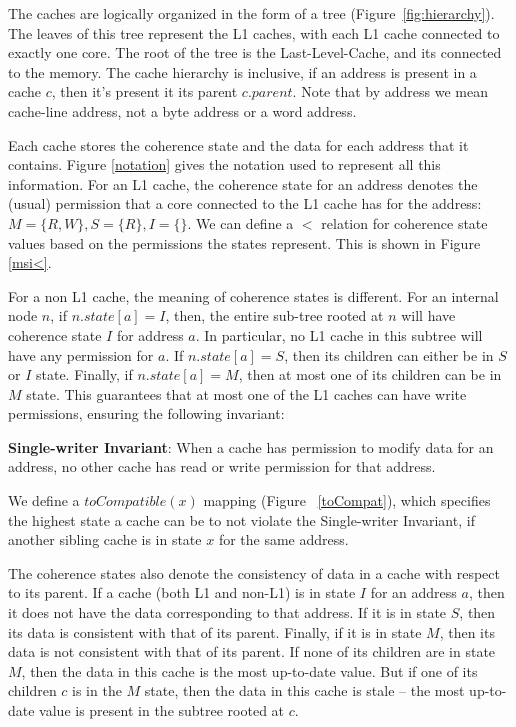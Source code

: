The caches are logically organized in the form of a tree
(Figure~\ref{fig:hierarchy}). The leaves of this tree represent the L1 caches,
with each L1 cache connected to exactly one core. The root of the tree is the
Last-Level-Cache, and its connected to the memory. The cache hierarchy is
inclusive, \ie if an address is present in a cache $c$, then it's present it its
parent $c.parent$. Note that by address we mean cache-line address, not a byte
address or a word address.

Each cache stores the coherence state and the data for each address that it
contains.
Figure \ref{notation} gives the notation used to represent all this
information. For an L1 cache, the coherence state for an address denotes the
(usual) permission that a core connected to the L1 cache has for the address: $M
= \{R, W\}, S = \{R\}, I = \{\}$. We can define a $<$ relation for coherence
state values based on the permissions the states represent. This is shown in
Figure \ref{msi<}.

For a non L1 cache, the meaning of coherence states is different. For an
internal node $n$, if $n.state[a] = I$, then, the entire sub-tree rooted at $n$
will have coherence state $I$ for address $a$. In particular, no L1 cache in
this subtree will have any permission for $a$. If $n.state[a] = S$, then its
children can either be in $S$ or $I$ state. Finally, if $n.state[a] = M$, then
at most one of its children can be in $M$ state. This guarantees that at most
one of the L1 caches can have write permissions, ensuring the following
invariant:

\begin{theorem}
\textbf{Single-writer Invariant}: When a cache has permission to modify data for
an address, no other cache has read or write permission for that
address.
\label{singleWriter}
\end{theorem}

We define a $toCompatible(x)$ mapping (Figure ~\ref{toCompat}), which specifies
the highest state a cache can be to not violate the Single-writer Invariant, if
another sibling cache is in state $x$ for the same address.

The coherence states also denote the consistency of data in a cache with respect
to its parent. If a cache (both L1 and non-L1) is in state $I$ for an address $a$,
then it does not have the data corresponding to that address. If it is in state
$S$, then its data is consistent with that of its parent. Finally, if it is in
state $M$, then its data is not consistent with that of its parent. If none of
its children are in state $M$, then the data in this cache is the most
up-to-date value. But if one of its children $c$ is in the $M$ state, then the
data in this cache is stale -- the most up-to-date value is present in the
subtree rooted at $c$.

